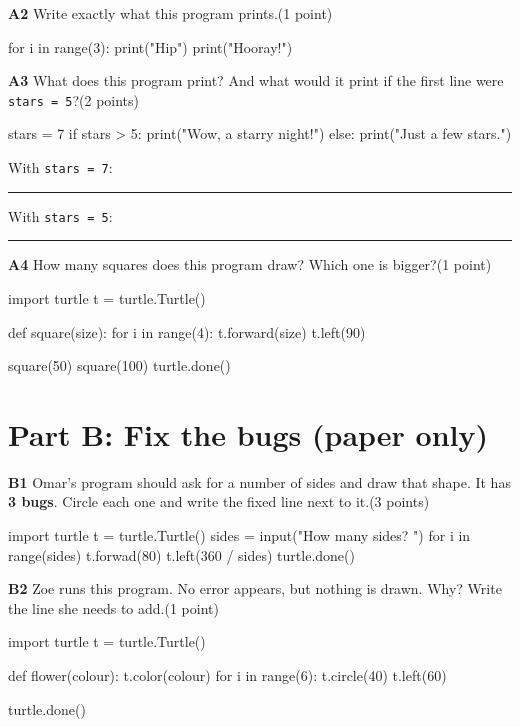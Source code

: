 \documentclass[level=1]{kidscode}
\newcommand{\qnum}[1]{\textbf{\color{kcaccent}#1}\quad}
\newcommand{\pts}[1]{\hfill{\small(#1)}}
\begin{document}
\qnum{A2} Write exactly what this program prints.\pts{1 point}\par
\begin{minipage}[t]{0.5\linewidth}
\begin{pycode}
for i in range(3):
    print("Hip")
print("Hooray!")
\end{pycode}
\end{minipage}\hfill
\begin{minipage}[t]{0.46\linewidth}\vspace{2pt}
\answerspace{2.8cm}
\end{minipage}

\qnum{A3} What does this program print? And what would it print if the first line were \texttt{stars = 5}?\pts{2 points}
\begin{pycode}
stars = 7
if stars > 5:
    print("Wow, a starry night!")
else:
    print("Just a few stars.")
\end{pycode}
With \texttt{stars = 7}: \rule{8cm}{0.4pt}\par\medskip
With \texttt{stars = 5}: \rule{8cm}{0.4pt}

\qnum{A4} How many squares does this program draw? Which one is bigger?\pts{1 point}
\begin{pycode}
import turtle
t = turtle.Turtle()

def square(size):
    for i in range(4):
        t.forward(size)
        t.left(90)

square(50)
square(100)
turtle.done()
\end{pycode}

\section{Part B: Fix the bugs (paper only)}
\qnum{B1} Omar's program should ask for a number of sides and draw that shape.
It has \textbf{3 bugs}. Circle each one and write the fixed line next to it.\pts{3 points}
\begin{pycode}
import turtle
t = turtle.Turtle()
sides = input("How many sides? ")
for i in range(sides)
    t.forwad(80)
    t.left(360 / sides)
turtle.done()
\end{pycode}

\qnum{B2} Zoe runs this program. No error appears, but nothing is drawn. Why? Write the line she needs to add.\pts{1 point}
\begin{pycode}
import turtle
t = turtle.Turtle()

def flower(colour):
    t.color(colour)
    for i in range(6):
        t.circle(40)
        t.left(60)

turtle.done()
\end{pycode}
\end{document}
